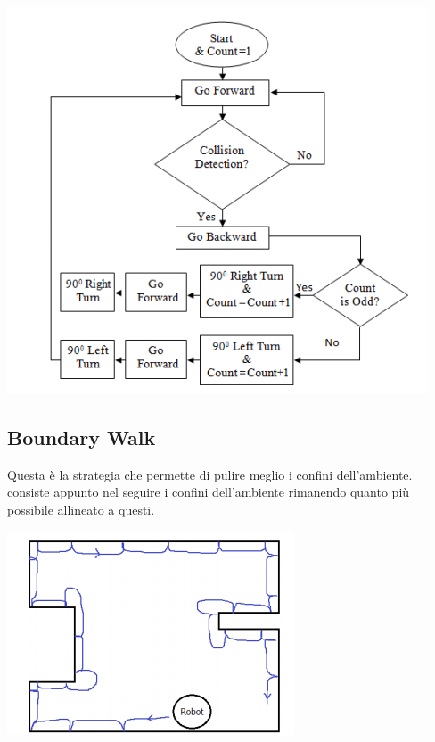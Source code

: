 \documentclass{article}
\begin{document}
\begin{center}
\includegraphics[scale=0.5]{media/sche4ma zig-zag.png}
\end{center}
\subsection{Boundary Walk}
Questa è la strategia che permette di pulire meglio i confini dell'ambiente. consiste appunto nel seguire i confini dell'ambiente rimanendo quanto più possibile allineato a questi.

\begin{center}
\includegraphics[scale=0.7]{media/boundary walk.png}
\end{center}
\end{document}
